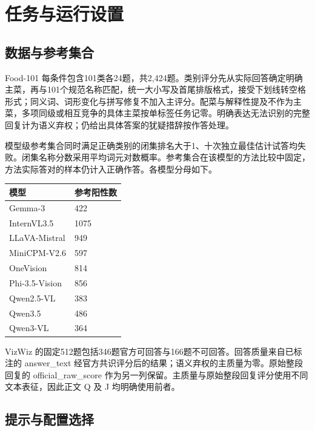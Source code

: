 \section{任务与运行设置}\label{ux4efbux52a1ux4e0eux8fd0ux884cux8bbeux7f6e}

\subsection{数据与参考集合}\label{ux6570ux636eux4e0eux53c2ux8003ux96c6ux5408}

Food-101 每条件包含101类各24题，共2,424题。类别评分先从实际回答确定明确主菜，再与101个规范名称匹配，统一大小写及首尾排版格式，接受下划线转空格形式；同义词、词形变化与拼写修复不加入主评分。配菜与解释性提及不作为主菜，多项同级或相互竞争的具体主菜按单标签任务记零。明确表达无法识别的完整回复计为语义弃权；仍给出具体答案的犹疑措辞按作答处理。

模型级参考集合同时满足正确类别的闭集排名大于1、十次独立最佳估计试答均失败。闭集名称分数采用平均词元对数概率。参考集合在该模型的方法比较中固定，方法实际答对的样本仍计入正确作答。各模型分母如下。

\begin{longtable}[]{@{}ll@{}}
\toprule\noalign{}
模型 & 参考阳性数 \\
\midrule\noalign{}
\endhead
\bottomrule\noalign{}
\endlastfoot
Gemma-3 & 422 \\
InternVL3.5 & 1075 \\
LLaVA-Mistral & 949 \\
MiniCPM-V2.6 & 597 \\
OneVision & 814 \\
Phi-3.5-Vision & 856 \\
Qwen2.5-VL & 383 \\
Qwen3.5 & 486 \\
Qwen3-VL & 364 \\
\end{longtable}

VizWiz 的固定512题包括346题官方可回答与166题不可回答。回答质量来自已标注的 answer\_text 经官方共识评分后的结果；语义弃权的主质量为零。原始整段回复的 official\_raw\_score 作为另一列保留。主质量与原始整段回复评分使用不同文本表征，因此正文 Q 及 J 均明确使用前者。

\subsection{提示与配置选择}\label{ux63d0ux793aux4e0eux914dux7f6eux9009ux62e9}

